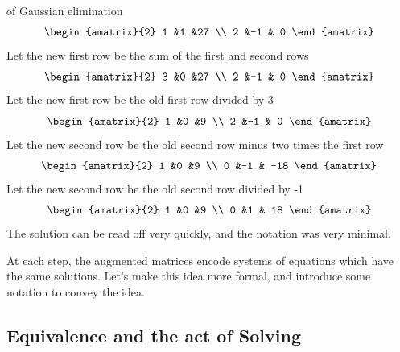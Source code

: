 \begin{example} of Gaussian elimination
\[
 \begin{amatrix}{2}
1 &1 &27 \\ 2 &-1 & 0
\end{amatrix}
\]
Let the new first row be the sum of the first and second rows
\[
 \begin{amatrix}{2}
3 &0 &27 \\ 2 &-1 & 0
\end{amatrix}
\]
Let the new first row be the old first row divided by 3
\[
 \begin{amatrix}{2}
1 &0 &9 \\ 2 &-1 & 0
\end{amatrix}
\]
Let the new second row be the old second row minus two times the first row 
\[
 \begin{amatrix}{2}
1 &0 &9 \\ 0 &-1 & -18
\end{amatrix}
\]
Let the new  second row be the old second row divided by -1
\[
 \begin{amatrix}{2}
1 &0 &9 \\ 0 &1 & 18
\end{amatrix}
\]
The solution can be read off very quickly, and the notation was very minimal. 
\end{example}
 At each step, the augmented matrices encode systems of equations which have the same solutions. Let's make this idea more formal, and introduce some notation to convey the idea.

\subsection{Equivalence and the act of Solving}

